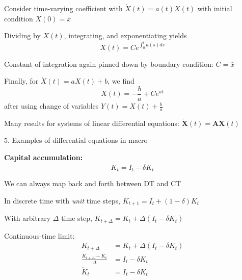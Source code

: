 \documentclass[11pt, aspectratio=169]{beamer}
\newenvironment{witemize}{\itemize\addtolength{\itemsep}{10pt}}{\enditemize}
\begin{document}
\begin{frame}{}
\begin{witemize}
\item Consider time-varying coefficient with $\dot X(t) = a(t) X(t)$ with initial condition $X(0) = \bar x$

\item Dividing by $X(t)$, integrating, and exponentiating yields 
\begin{equation*}
	X(t) = C e^{ \int_0^t a(s) ds }
\end{equation*}

\item Constant of integration again pinned down by boundary condition: $C = \bar x$

\item Finally, for $\dot X(t) = a X(t) + b$, we find
\begin{equation*}
	X(t) = - \frac{b}{a} + C e^{at}
\end{equation*}
after using change of variables $Y(t) = X(t) + \frac{b}{a}$

\item Many results for systems of linear differential equations: $\dot{\bm X}(t) = \bm A \bm X(t)$

\end{witemize}
\end{frame}


\begin{frame}{5. Examples of differential equations in macro}

\textbf{Capital accumulation:}
\begin{equation*}
\dot K_t = I_t - \delta K_t
\end{equation*}
\begin{witemize}
\item We can always map back and forth between DT and CT

\item In discrete time with \textit{unit} time steps, $K_{t+1} = I_t + (1-\delta) K_t$

\item With arbitrary $\Delta$ time step, $K_{t+\Delta} = K_t + \Delta (I_t - \delta K_t)$

\item Continuous-time limit:
\begin{align*}
	K_{t+\Delta} &= K_t + \Delta (I_t - \delta K_t) \\
	\frac{K_{t+\Delta} - K_t}{\Delta} &= I_t -\delta K_t \\
	\dot K_t &= I_t -\delta K_t
\end{align*}
\end{witemize}
\end{frame}
\end{document}
